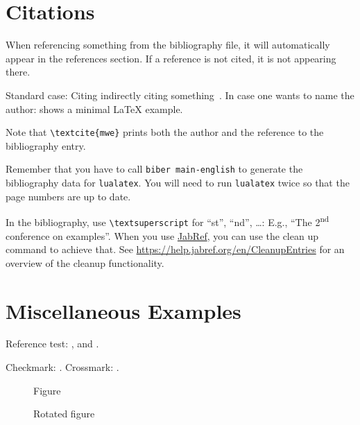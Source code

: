 \section{Citations}

When referencing something from the bibliography file, it will automatically appear in the references section.
If a reference is not cited, it is not appearing there.

\begin{ltgexample}
Standard case: Citing indirectly citing something~\cite{mwe}.
In case one wants to name the author: \textcite{mwe} shows a minimal \LaTeX{} example.
\end{ltgexample}

Note that \texttt{\textbackslash textcite\{mwe\}} prints both the author and the reference to the bibliography entry.

Remember that you have to call \texttt{biber main-english} to generate the bibliography data for \texttt{lualatex}.
You will need to run \texttt{lualatex} twice so that the page numbers are up to date.


In the bibliography, use \texttt{\textbackslash textsuperscript} for \enquote{st}, \enquote{nd}, \ldots:
E.g., \enquote{The 2\textsuperscript{nd} conference on examples}.
When you use \href{https://www.jabref.org}{JabRef}, you can use the clean up command to achieve that.
See \url{https://help.jabref.org/en/CleanupEntries} for an overview of the cleanup functionality.

\section{Miscellaneous Examples}
\label{ssec:example}

Reference test: ,  and .

\begin{ltgexample}
Checkmark: \dingcheck.
Crossmark: \dingcross.
\end{ltgexample}

\begin{figure}
  \missingfigure{}
  \caption{Figure}
  \label{fig:Abbildung}
\end{figure}

\begin{landscape}
  \begin{figure}
    \missingfigure{}
    \caption{Rotated figure}
    \label{fig:AbbildungGedreht}
  \end{figure}
\end{landscape}

